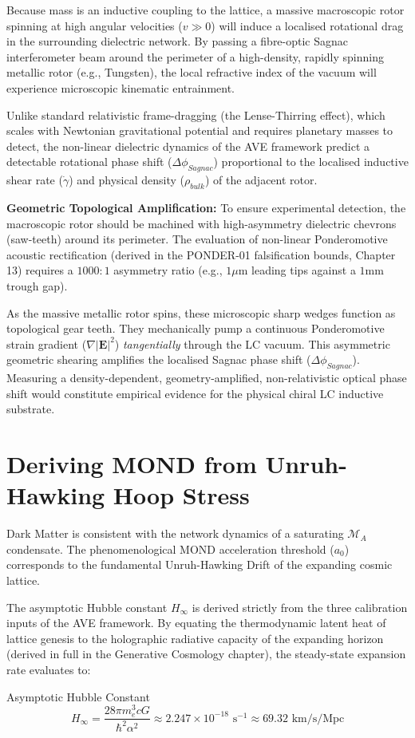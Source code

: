 Because mass is an inductive coupling to the lattice, a massive macroscopic rotor spinning at high angular velocities ($v \gg 0$) will induce a localised rotational drag in the surrounding dielectric network. By passing a fibre-optic Sagnac interferometer beam around the perimeter of a high-density, rapidly spinning metallic rotor (e.g., Tungsten), the local refractive index of the vacuum will experience microscopic kinematic entrainment.

Unlike standard relativistic frame-dragging (the Lense-Thirring effect), which scales with Newtonian gravitational potential and requires planetary masses to detect, the non-linear dielectric dynamics of the AVE framework predict a detectable rotational phase shift ($\Delta\phi_{Sagnac}$) proportional to the localised inductive shear rate ($\dot{\gamma}$) and physical density ($\rho_{bulk}$) of the adjacent rotor. 

\textbf{Geometric Topological Amplification:} To ensure experimental detection, the macroscopic rotor should be machined with high-asymmetry dielectric chevrons (saw-teeth) around its perimeter. The evaluation of non-linear Ponderomotive acoustic rectification (derived in the PONDER-01 falsification bounds, Chapter 13) requires a $1000:1$ asymmetry ratio (e.g., $1 \mu\text{m}$ leading tips against a $1 \text{mm}$ trough gap). 

As the massive metallic rotor spins, these microscopic sharp wedges function as topological gear teeth. They mechanically pump a continuous Ponderomotive strain gradient ($\nabla |\mathbf{E}|^2$) \textit{tangentially} through the LC vacuum. This asymmetric geometric shearing amplifies the localised Sagnac phase shift ($\Delta\phi_{Sagnac}$). Measuring a density-dependent, geometry-amplified, non-relativistic optical phase shift would constitute empirical evidence for the physical chiral LC inductive substrate.

\section{Deriving MOND from Unruh-Hawking Hoop Stress}
\label{sec:galactic_saturation}

Dark Matter is consistent with the network dynamics of a
saturating $\mathcal{M}_{A}$ condensate. The phenomenological MOND acceleration threshold ($a_{0}$)
corresponds to the fundamental Unruh-Hawking Drift of
the expanding cosmic lattice.

The asymptotic Hubble constant $H_\infty$ is derived strictly from the three calibration inputs of the AVE framework. By equating the thermodynamic latent heat of lattice genesis to the holographic radiative capacity of the expanding horizon (derived in full in the Generative Cosmology chapter), the steady-state expansion rate evaluates to:
\begin{resultbox}{Asymptotic Hubble Constant}
\begin{equation}
    H_\infty = \frac{28\pi m_e^3 c G}{\hbar^2 \alpha^2} \approx 2.247 \times 10^{-18} \text{ s}^{-1} \approx 69.32 \text{ km/s/Mpc}
    \label{eq:H_infinity}
\end{equation}
\end{resultbox}

